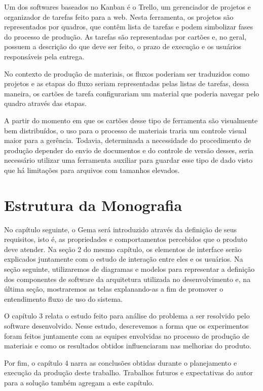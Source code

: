 Um dos softwares baseados no Kanban é o Trello, um gerenciador de projetos e organizador de tarefas feito para a web. Nesta ferramenta, os projetos são representados por quadros, que contêm lista de tarefas e podem simbolizar fases do processo de produção. As tarefas são representadas por cartões e, no geral, possuem a descrição do que deve ser feito, o prazo de execução e os usuários responsáveis pela entrega.

No contexto de produção de materiais, os fluxos poderiam ser traduzidos como projetos e as etapas do fluxo seriam representadas pelas listas de tarefas, dessa maneira, os cartões de tarefa configurariam um material que poderia navegar pelo quadro através das etapas.

A partir do momento em que os cartões desse tipo de ferramenta são visualmente bem distribuídos, o uso para o processo de materiais traria um controle visual maior para a gerência. Todavia, determinada a necessidade do procedimento de produção depender do envio de documentos e do controle de versão desses, seria necessário utilizar uma ferramenta auxiliar para guardar esse tipo de dado visto que há limitações para arquivos com tamanhos elevados.

\section{Estrutura da Monografia}

No capítulo seguinte, o Gema será introduzido através da definição de seus requisitos, isto é, as propriedades e comportamentos percebidos que o produto deve atender. Na seção 2 do mesmo capítulo, os elementos de interface serão explicados juntamente com o estudo de interação entre eles e os usuários. Na seção seguinte, utilizaremos de diagramas e modelos para representar a definição dos componentes de software da arquitetura utilizada no desenvolvimento e, na última seção, mostraremos as telas explanando-as a fim de promover o entendimento fluxo de uso do sistema.

O capítulo 3 relata o estudo feito para análise do problema a ser resolvido pelo software desenvolvido. Nesse estudo, descrevemos a forma que os experimentos foram feitos juntamente com as equipes envolvidas no processo de produção de materiais e como os resultados obtidos influenciaram nas melhorias do produto.

Por fim, o capítulo 4 narra as  conclusões obtidas durante o planejamento e execução da produção deste trabalho. Trabalhos futuros e expectativas do autor para a solução também agregam a este capítulo.

